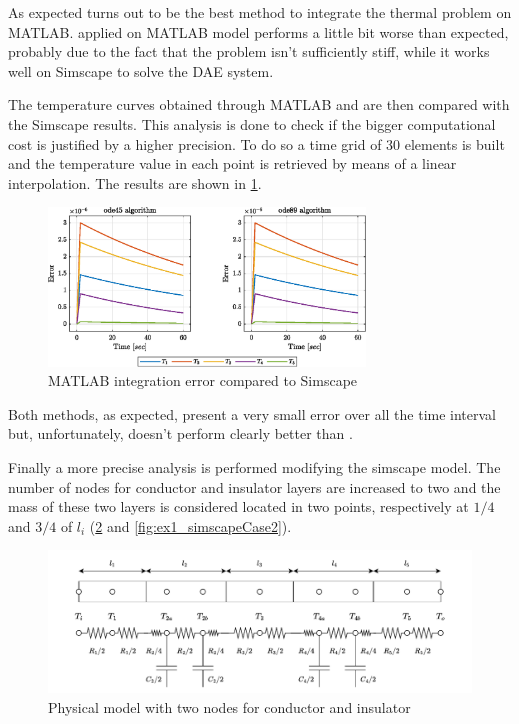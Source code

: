 \documentclass[11pt,a4paper,oneside]{article}
\begin{document}
As expected  turns out to be the best method to integrate the thermal problem on MATLAB.
 applied on MATLAB model performs a little bit worse than expected, probably due to the fact that the problem isn't sufficiently stiff, while it works well on Simscape to solve the DAE system.

The temperature curves obtained through MATLAB  and  are then compared with the Simscape results.
This analysis is done to check if the bigger computational cost is justified by a higher precision.
To do so a time grid of 30 elements is built and the temperature value in each point is retrieved by means of a linear interpolation.
The results are shown in \cref{fig:ex1_errorCompare}.
\begin{figure}[H]
    \centering
    \includegraphics*[width=0.75\textwidth, keepaspectratio]{Figures/ex1_errorCompare.eps}
    \caption[]{\label{fig:ex1_errorCompare} MATLAB integration error compared to Simscape}
\end{figure}

Both methods, as expected, present a very small error over all the time interval but, unfortunately,  doesn't perform clearly better than .

Finally a more precise analysis is performed modifying the simscape model.
The number of nodes for conductor and insulator layers are increased to two and the mass of these two layers is considered located in two points, respectively at $1/4$ and $3/4$ of $l_i$ (\cref{fig:phyModelCase2} and \cref{fig:ex1_simscapeCase2}).
\begin{figure}[H]
    \centering
    \includegraphics*[width=1\textwidth, keepaspectratio]{Figures/ex1_phyModelCase2.pdf}
    \caption[]{\label{fig:phyModelCase2} Physical model with two nodes for conductor and insulator}
\end{figure}
\end{document}

